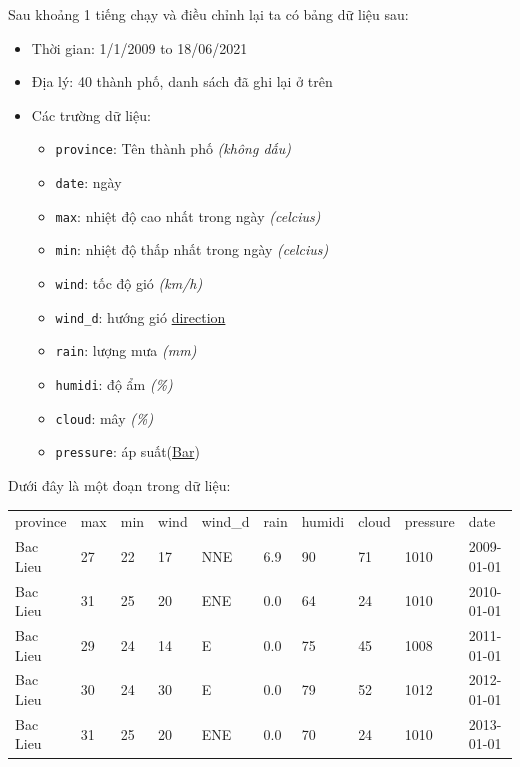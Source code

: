 \documentclass{article}
\begin{document}
Sau khoảng 1 tiếng chạy và điều chỉnh lại ta có bảng dữ liệu sau:
\begin{itemize}
	\item Thời gian: 1/1/2009 to 18/06/2021
	\item Địa lý: 40 thành phố, danh sách đã ghi lại ở trên
	\item { Các trường dữ liệu:
	      \begin{itemize}
		      \item \texttt{province}: Tên thành phố \emph{(không dấu)}
		      \item \texttt{date}: ngày
		      \item \texttt{max}: nhiệt độ cao nhất trong ngày \emph{(celcius)}
		      \item \texttt{min}: nhiệt độ thấp nhất trong ngày \emph{(celcius)}
		      \item \texttt{wind}: tốc độ gió \emph{(km/h)}
		      \item \texttt{wind\_d}: hướng gió \href{https://www7.ncdc.noaa.gov/climvis/help_wind.html}{direction}
		      \item \texttt{rain}: lượng mưa \emph{(mm)}
		      \item \texttt{humidi}: độ ẩm \emph{(\%)}
		      \item \texttt{cloud}: mây \emph{(\%)}
		      \item \texttt{pressure}: áp suất(\href{https://en.wikipedia.org/wiki/Bar_(unit)}{Bar})
	      \end{itemize}
	      }
\end{itemize}
Dưới đây là một đoạn trong dữ liệu:
\begin{table}[H]
	\begin{tabular}{llllllllll}
		province & max & min & wind & wind\_d & rain & humidi & cloud & pressure & date       \\
		Bac Lieu & 27  & 22  & 17   & NNE     & 6.9  & 90     & 71    & 1010     & 2009-01-01 \\
		Bac Lieu & 31  & 25  & 20   & ENE     & 0.0  & 64     & 24    & 1010     & 2010-01-01 \\
		Bac Lieu & 29  & 24  & 14   & E       & 0.0  & 75     & 45    & 1008     & 2011-01-01 \\
		Bac Lieu & 30  & 24  & 30   & E       & 0.0  & 79     & 52    & 1012     & 2012-01-01 \\
		Bac Lieu & 31  & 25  & 20   & ENE     & 0.0  & 70     & 24    & 1010     & 2013-01-01
	\end{tabular}
\end{table}
\end{document}
